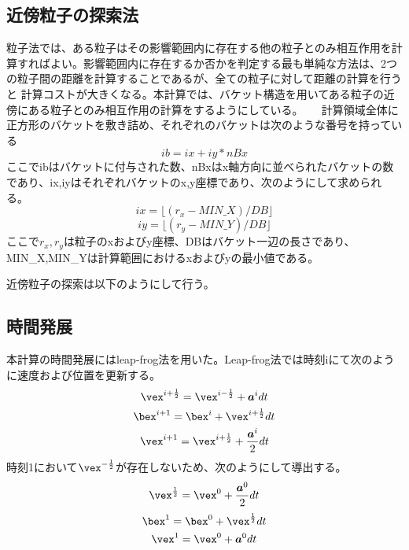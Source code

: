\documentclass[]{jsarticle}
\begin{document}
\subsection{近傍粒子の探索法}
粒子法では、ある粒子はその影響範囲内に存在する他の粒子とのみ相互作用を計算すればよい。影響範囲内に存在するか否かを判定する最も単純な方法は、2つの粒子間の距離を計算することであるが、全ての粒子に対して距離の計算を行うと
計算コストが大きくなる。本計算では、バケット構造を用いてある粒子の近傍にある粒子とのみ相互作用の計算をするようにしている。\cite{Koshiduka2014}
　
計算領域全体に正方形のバケットを敷き詰め、それぞれのバケットは次のような番号を持っている
\begin{equation}
ib=ix+iy*nBx
\end{equation}
ここでibはバケットに付与された数、nBxはx軸方向に並べられたバケットの数であり、ix,iyはそれぞれバケットのx,y座標であり、次のようにして求められる。
\begin{equation}
ix=\lfloor(r_x-MIN\_X)/DB \rfloor
\end{equation}
\begin{equation}
iy=\lfloor(r_y-MIN\_Y)/DB \rfloor
\end{equation}
ここで$r_x,r_y$は粒子のxおよびy座標、DBはバケット一辺の長さであり、MIN\_X,MIN\_Yは計算範囲におけるxおよびyの最小値である。

近傍粒子の探索は以下のようにして行う。


\subsection{時間発展}
本計算の時間発展にはleap-frog法を用いた。Leap-frog法では時刻iにて次のように速度および位置を更新する。
\begin{equation}
  \vex^{i+\frac{1}{2}}=\vex^{i-\frac{1}{2}}+\bm{a}^idt
\end{equation}
\begin{equation}
  \bex^{i+1}=\bex^i+\vex^{i+\frac{1}{2}}dt
\end{equation}
\begin{equation}
  \vex^{i+1}=\vex^{i+\frac{1}{2}}+\frac{\bm{a}^i}{2}dt
\end{equation}
時刻1において$\vex^{-\frac{1}{2}}$が存在しないため、次のようにして導出する。
\begin{equation}
  \vex^{\frac{1}{2}}=\vex^{0}+\frac{\bm{a}^0}{2}dt
\end{equation}
\begin{equation}
  \bex^{1}=\bex^0+\vex^{\frac{1}{2}}dt
\end{equation}
\begin{equation}
  \vex^{1}=\vex^{0}+\bm{a}^0dt
\end{equation}
\end{document}
